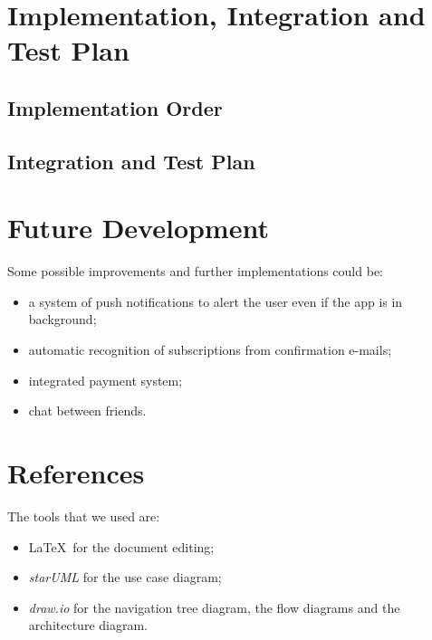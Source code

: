 \documentclass[11pt]{article}
\begin{document}
\newpage
\section{Implementation, Integration and Test Plan}\label{sec:test}
\subsection{Implementation Order}


\subsection{Integration and Test Plan}


\newpage
\section{Future Development}\label{sec:dev}
Some possible improvements and further implementations could be:
\begin{itemize}
    \item a system of push notifications to alert the user even if the app is in background;
    \item automatic recognition of subscriptions from confirmation e-mails;
    \item integrated payment system;
    \item chat between friends.
\end{itemize}

\section{References}\label{sec:ref}
The tools that we used are:
\begin{itemize}
    \item \LaTeX\ for the document editing;
    \item \textit{starUML} for the use case diagram;
    \item \textit{draw.io} for the navigation tree diagram, the flow diagrams and the architecture diagram.
\end{itemize}
\end{document}
